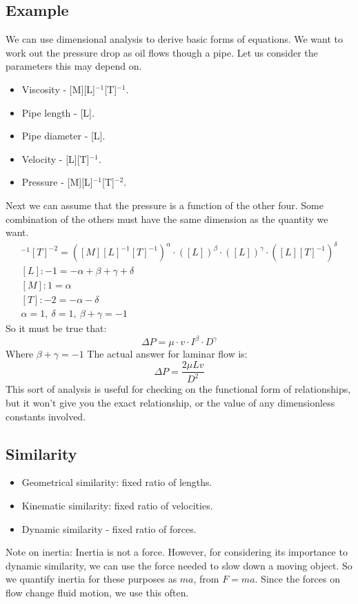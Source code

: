 \documentclass[class=report, crop=false, 12pt,a4paper]{standalone}
\begin{document}
\subsection{Example}
We can use dimensional analysis to derive basic forms of equations. We want to work out the pressure drop as oil flows though a pipe. Let us consider the parameters this may depend on. 
\begin{itemize}[noitemsep]
  \item Viscosity - [M][L]\(^{-1}\)[T]\(^{-1}\).
  \item Pipe length - [L].
  \item Pipe diameter - [L].
  \item Velocity - [L][T]\(^{-1}\).
  \item Pressure - [M][L]\(^{-1}\)[T]\(^{-2}\).
\end{itemize}
Next we can assume that the pressure is a function of the other four. Some combination of the others must have the same dimension as the quantity we want.
\begin{gather} 
  [M][L]^{-1}[T]^{-2} = ([M][L]^{-1}[T]^{-1})^\alpha \cdot ([L])^\beta \cdot ([L])^\gamma \cdot ([L][T]^{-1})^\delta \\
  [L]: -1 = -\alpha + \beta + \gamma + \delta\\
  [M]: 1 = \alpha \\
  [T]: -2 = -\alpha -\delta \\
  \alpha =1, \ \delta =1, \ \beta + \gamma = -1
\end{gather}
So it must be true that:
\begin{equation} 
  \Delta P = \mu \cdot v \cdot I^{\beta} \cdot D^{\gamma}
\end{equation} 
Where \(\beta + \gamma = -1\)
The actual answer for laminar flow is:
\begin{equation} 
  \Delta P = \frac{2\mu L v}{D^2}
\end{equation}
This sort of analysis is useful for checking on the functional form of relationships, but it won't give you the exact relationship, or the value of any dimensionless constants involved.
\subsection{Similarity}
\begin{itemize}[noitemsep]
  \item Geometrical similarity: fixed ratio of lengths.
  \item Kinematic similarity: fixed ratio of velocities.
  \item Dynamic similarity - fixed ratio of forces.
\end{itemize}
Note on inertia: Inertia is not a force. However, for considering its importance to dynamic similarity, we can use the force needed to slow down a moving object. So we quantify inertia for these purposes as \(ma\), from \(F = ma\). Since the forces on flow change fluid motion, we use this often. 
\end{document}
